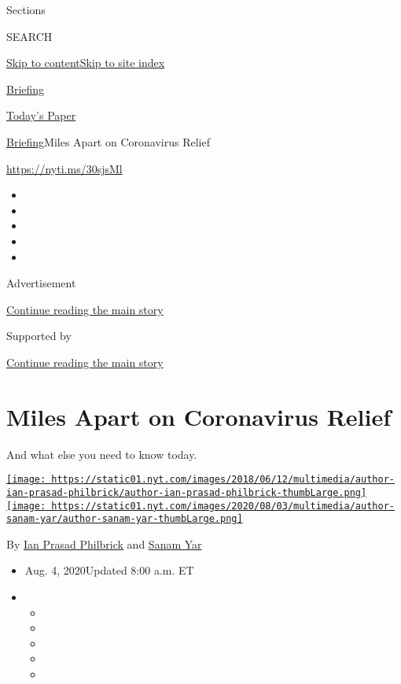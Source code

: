 Sections

SEARCH

\protect\hyperlink{site-content}{Skip to
content}\protect\hyperlink{site-index}{Skip to site index}

\href{https://www.nytimes.com/interactive/2018/briefing/global-morning-briefing-newsletter-signup.html}{Briefing}

\href{https://myaccount.nytimes.com/auth/login?response_type=cookie\&client_id=vi}{}

\href{https://www.nytimes.com/section/todayspaper}{Today's Paper}

\href{/interactive/2018/briefing/global-morning-briefing-newsletter-signup.html}{Briefing}\textbar{}Miles
Apart on Coronavirus Relief

\url{https://nyti.ms/30sjsMl}

\begin{itemize}
\item
\item
\item
\item
\item
\end{itemize}

Advertisement

\protect\hyperlink{after-top}{Continue reading the main story}

Supported by

\protect\hyperlink{after-sponsor}{Continue reading the main story}

\hypertarget{miles-apart-on-coronavirus-relief}{%
\section{Miles Apart on Coronavirus
Relief}\label{miles-apart-on-coronavirus-relief}}

And what else you need to know today.

\href{https://www.nytimes.com/by/ian-prasad-philbrick}{\texttt{[image: https://static01.nyt.com/images/2018/06/12/multimedia/author-ian-prasad-philbrick/author-ian-prasad-philbrick-thumbLarge.png]}}\href{https://www.nytimes.com/by/sanam-yar}{\texttt{[image: https://static01.nyt.com/images/2020/08/03/multimedia/author-sanam-yar/author-sanam-yar-thumbLarge.png]}}

By \href{https://www.nytimes.com/by/ian-prasad-philbrick}{Ian Prasad
Philbrick} and \href{https://www.nytimes.com/by/sanam-yar}{Sanam Yar}

\begin{itemize}
\item
  Aug. 4, 2020Updated 8:00 a.m. ET
\item
  \begin{itemize}
  \item
  \item
  \item
  \item
  \item
  \end{itemize}
\end{itemize}

